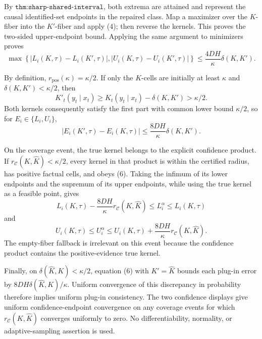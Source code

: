 By \(\texttt{thm:sharp-shared-interval}\), both extrema are attained and represent the causal identified-set endpoints in the repaired class.  Map a maximizer over the \(K\)-fiber into the \(K'\)-fiber and apply (4); then reverse the kernels.  This proves the two-sided upper-endpoint bound.  Applying the same argument to minimizers proves
\[
 \max\left\{|L_i(K,\tau)-L_i(K',\tau)|,
 |U_i(K,\tau)-U_i(K',\tau)|\right\}
 \le\frac{4DH}{\kappa}\delta(K,K'). \tag{5}
\]

By definition, \(r_{\mathrm{pos}}(\kappa)=\kappa/2\).  If only the \(K\)-cells are initially at least \(\kappa\) and \(\delta(K,K')<\kappa/2\), then
\[
 K'_t(y_t\mid x_t)\ge K_t(y_t\mid x_t)-\delta(K,K')>\kappa/2.
\]
Both kernels consequently satisfy the first part with common lower bound \(\kappa/2\), so for \(E_i\in\{L_i,U_i\}\),
\[
 |E_i(K',\tau)-E_i(K,\tau)|
 \le\frac{8DH}{\kappa}\delta(K,K'). \tag{6}
\]

On the coverage event, the true kernel belongs to the explicit confidence product.  If \(r_{\mathcal C}(K,\widehat K)<\kappa/2\), every kernel in that product is within the certified radius, has positive factual cells, and obeys (6).  Taking the infimum of its lower endpoints and the supremum of its upper endpoints, while using the true kernel as a feasible point, gives
\[
 L_i(K,\tau)-\frac{8DH}{\kappa}r_{\mathcal C}(K,\widehat K)
 \le L_i^\alpha\le L_i(K,\tau)
\]
and
\[
 U_i(K,\tau)\le U_i^\alpha
 \le U_i(K,\tau)+\frac{8DH}{\kappa}r_{\mathcal C}(K,\widehat K).
\]
The empty-fiber fallback is irrelevant on this event because the confidence product contains the positive-evidence true kernel.

Finally, on \(\delta(\widehat K,K)<\kappa/2\), equation (6) with \(K'=\widehat K\) bounds each plug-in error by \(8DH\delta(\widehat K,K)/\kappa\).  Uniform convergence of this discrepancy in probability therefore implies uniform plug-in consistency.  The two confidence displays give uniform confidence-endpoint convergence on any coverage events for which \(r_{\mathcal C}(K,\widehat K)\) converges uniformly to zero.  No differentiability, normality, or adaptive-sampling assertion is used.
